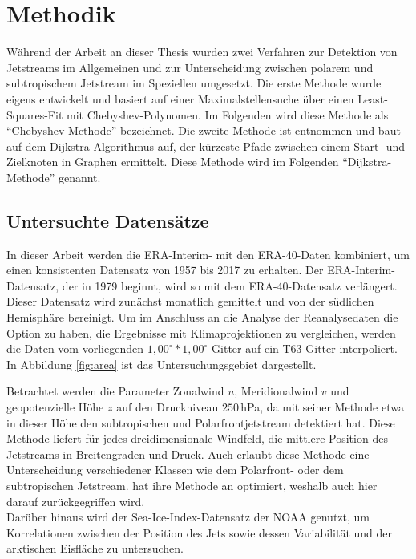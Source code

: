 \chapter{Methodik} \label{ch:methodik}
Während der Arbeit an dieser Thesis wurden zwei Verfahren zur Detektion von Jetstreams im Allgemeinen und zur Unterscheidung zwischen polarem und subtropischem Jetstream im Speziellen umgesetzt. Die erste Methode wurde eigens entwickelt und basiert auf einer Maximalstellensuche über einen Least-Squares-Fit mit Chebyshev-Polynomen. Im Folgenden wird diese Methode als \enquote{Chebyshev-Methode} bezeichnet. Die zweite Methode ist \citet{molnos-2017} entnommen und baut auf dem Dijkstra-Algorithmus auf, der kürzeste Pfade zwischen einem Start- und Zielknoten in Graphen ermittelt. Diese Methode wird im Folgenden \enquote{Dijkstra-Methode} genannt. 

\section{Untersuchte Datensätze}
In dieser Arbeit werden die ERA-Interim- \citep{dee-2011} mit den ERA-40-Daten \citep{uppala-2005} kombiniert, um einen konsistenten Datensatz von 1957 bis 2017 zu erhalten. Der ERA-Interim-Datensatz, der in 1979 beginnt, wird so mit dem ERA-40-Datensatz verlängert. Dieser Datensatz wird zunächst monatlich gemittelt und von der südlichen Hemisphäre bereinigt. Um im Anschluss an die Analyse der Reanalysedaten die Option zu haben, die Ergebnisse mit Klimaprojektionen zu vergleichen, werden die Daten vom vorliegenden $1,00^{\circ} \ast 1,00^{\circ}$-Gitter auf ein T63-Gitter interpoliert. In Abbildung \ref{fig:area} ist das Untersuchungsgebiet dargestellt.

Betrachtet werden die Parameter Zonalwind $u$, Meridionalwind $v$ und geopotenzielle Höhe $z$ auf den Druckniveau $250\,$hPa, da \citet{rikus-2015} mit seiner Methode etwa in dieser Höhe den subtropischen und Polarfrontjetstream detektiert hat. Diese Methode liefert für jedes dreidimensionale Windfeld, die mittlere Position des Jetstreams in Breitengraden und Druck. Auch erlaubt diese Methode eine Unterscheidung verschiedener Klassen wie dem Polarfront- oder dem subtropischen Jetstream. \citet{molnos-2017} hat ihre Methode an \citet{rikus-2015} optimiert, weshalb auch hier darauf zurückgegriffen wird.
\\
Darüber hinaus wird der Sea-Ice-Index-Datensatz der NOAA \citep{sii-2016} genutzt, um Korrelationen zwischen der Position des Jets sowie dessen Variabilität und der arktischen Eisfläche zu untersuchen.


